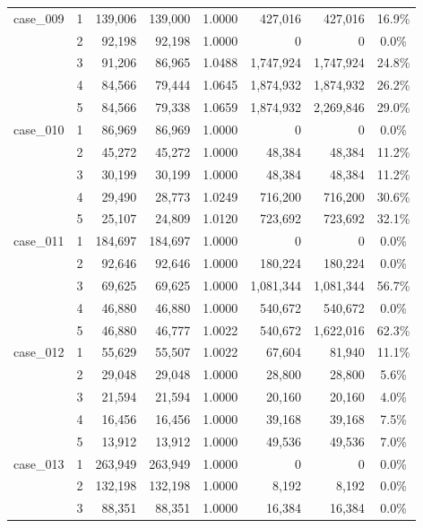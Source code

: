 \begin{footnotesize}
\begin{longtable}{l c rr c rr c}
\addlinespace[2pt]
case\_009 & 1 & 139{,}006 & 139{,}000 & 1.0000 & 427{,}016 & 427{,}016 & 16.9\% \\
 & 2 & 92{,}198 & 92{,}198 & 1.0000 & 0 & 0 & 0.0\% \\
 & 3 & 91{,}206 & 86{,}965 & 1.0488 & 1{,}747{,}924 & 1{,}747{,}924 & 24.8\% \\
 & 4 & 84{,}566 & 79{,}444 & 1.0645 & 1{,}874{,}932 & 1{,}874{,}932 & 26.2\% \\
 & 5 & 84{,}566 & 79{,}338 & 1.0659 & 1{,}874{,}932 & 2{,}269{,}846 & 29.0\% \\
\addlinespace[2pt]
case\_010 & 1 & 86{,}969 & 86{,}969 & 1.0000 & 0 & 0 & 0.0\% \\
 & 2 & 45{,}272 & 45{,}272 & 1.0000 & 48{,}384 & 48{,}384 & 11.2\% \\
 & 3 & 30{,}199 & 30{,}199 & 1.0000 & 48{,}384 & 48{,}384 & 11.2\% \\
 & 4 & 29{,}490 & 28{,}773 & 1.0249 & 716{,}200 & 716{,}200 & 30.6\% \\
 & 5 & 25{,}107 & 24{,}809 & 1.0120 & 723{,}692 & 723{,}692 & 32.1\% \\
\addlinespace[2pt]
case\_011 & 1 & 184{,}697 & 184{,}697 & 1.0000 & 0 & 0 & 0.0\% \\
 & 2 & 92{,}646 & 92{,}646 & 1.0000 & 180{,}224 & 180{,}224 & 0.0\% \\
 & 3 & 69{,}625 & 69{,}625 & 1.0000 & 1{,}081{,}344 & 1{,}081{,}344 & 56.7\% \\
 & 4 & 46{,}880 & 46{,}880 & 1.0000 & 540{,}672 & 540{,}672 & 0.0\% \\
 & 5 & 46{,}880 & 46{,}777 & 1.0022 & 540{,}672 & 1{,}622{,}016 & 62.3\% \\
\addlinespace[2pt]
case\_012 & 1 & 55{,}629 & 55{,}507 & 1.0022 & 67{,}604 & 81{,}940 & 11.1\% \\
 & 2 & 29{,}048 & 29{,}048 & 1.0000 & 28{,}800 & 28{,}800 & 5.6\% \\
 & 3 & 21{,}594 & 21{,}594 & 1.0000 & 20{,}160 & 20{,}160 & 4.0\% \\
 & 4 & 16{,}456 & 16{,}456 & 1.0000 & 39{,}168 & 39{,}168 & 7.5\% \\
 & 5 & 13{,}912 & 13{,}912 & 1.0000 & 49{,}536 & 49{,}536 & 7.0\% \\
\addlinespace[2pt]
case\_013 & 1 & 263{,}949 & 263{,}949 & 1.0000 & 0 & 0 & 0.0\% \\
 & 2 & 132{,}198 & 132{,}198 & 1.0000 & 8{,}192 & 8{,}192 & 0.0\% \\
 & 3 & 88{,}351 & 88{,}351 & 1.0000 & 16{,}384 & 16{,}384 & 0.0\% \\

\end{longtable}
\end{footnotesize}
